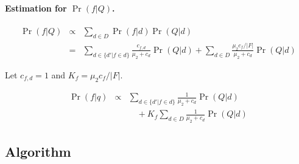 \paragraph{Estimation for $\Pr(f|Q)$.}

\begin{eqnarray}
  \Pr(f|Q) &\propto& \sum_{d \in D} \Pr(f|d) \Pr(Q|d) \nonumber\\
  &=& \sum_{d \in \{d'|f \in d\}} \frac{c_{f,d}}{\mu_2 + c_d} \Pr(Q|d) + \sum_{d \in D} \frac{\mu_2 c_f / |F|}{\mu_2 + c_d} \Pr(Q|d)
\end{eqnarray}

Let $c_{f,d} = 1$ and $K_f = \mu_2 c_f/|F|$.

\begin{eqnarray}
  \Pr(f|q) &\propto& \sum_{d \in \{d'|f \in d\}} \frac{1}{\mu_2 + c_d} \Pr(Q|d) \\
  && \quad + K_f \sum_{d \in D} \frac{1}{\mu_2 + c_d} \Pr(Q|d)
\end{eqnarray}

\subsection{Algorithm}

